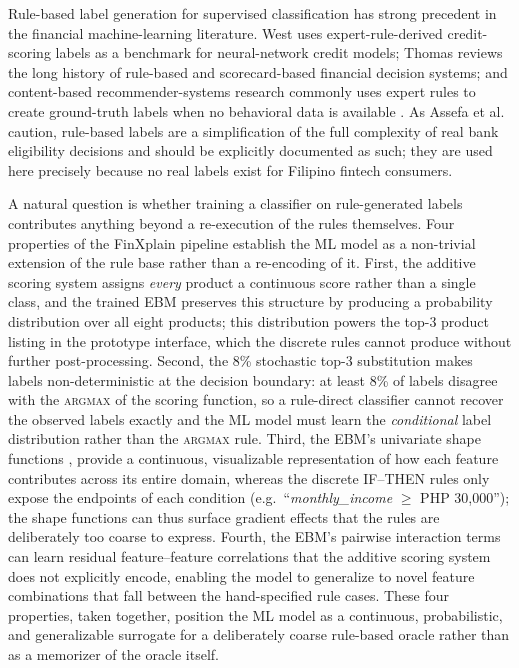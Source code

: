 \documentclass{icsthesis}
\begin{document}
\begin{mainmatter}
					Rule-based label generation for supervised classification has strong precedent in the financial machine-learning literature. West \cite{ref56} uses expert-rule-derived credit-scoring labels as a benchmark for neural-network credit models; Thomas \cite{ref57} reviews the long history of rule-based and scorecard-based financial decision systems; and content-based recommender-systems research commonly uses expert rules to create ground-truth labels when no behavioral data is available \cite{ref13}. As Assefa et al. \cite{ref46} caution, rule-based labels are a simplification of the full complexity of real bank eligibility decisions and should be explicitly documented as such; they are used here precisely because no real labels exist for Filipino fintech consumers.

					A natural question is whether training a classifier on rule-generated labels contributes anything beyond a re-execution of the rules themselves. Four properties of the FinXplain pipeline establish the ML model as a non-trivial extension of the rule base rather than a re-encoding of it. First, the additive scoring system assigns \emph{every} product a continuous score rather than a single class, and the trained EBM preserves this structure by producing a probability distribution over all eight products; this distribution powers the top-3 product listing in the prototype interface, which the discrete rules cannot produce without further post-processing. Second, the 8\% stochastic top-3 substitution makes labels non-deterministic at the decision boundary: at least 8\% of labels disagree with the \textsc{argmax} of the scoring function, so a rule-direct classifier cannot recover the observed labels exactly and the ML model must learn the \emph{conditional} label distribution rather than the \textsc{argmax} rule. Third, the EBM's univariate shape functions \cite{ref48}, \cite{ref49} provide a continuous, visualizable representation of how each feature contributes across its entire domain, whereas the discrete IF--THEN rules only expose the endpoints of each condition (e.g.\ ``\emph{monthly\_income} $\geq$ PHP 30{,}000''); the shape functions can thus surface gradient effects that the rules are deliberately too coarse to express. Fourth, the EBM's pairwise interaction terms \cite{ref15} can learn residual feature--feature correlations that the additive scoring system does not explicitly encode, enabling the model to generalize to novel feature combinations that fall between the hand-specified rule cases. These four properties, taken together, position the ML model as a continuous, probabilistic, and generalizable surrogate for a deliberately coarse rule-based oracle rather than as a memorizer of the oracle itself.


\end{mainmatter}
\end{document}
